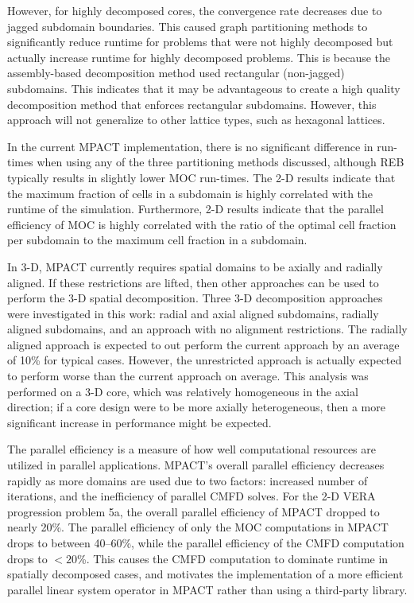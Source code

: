 {{    However, for highly decomposed cores, the convergence rate decreases due to jagged subdomain boundaries.
    This caused graph partitioning methods to significantly reduce runtime for problems that were not highly decomposed but actually increase runtime for highly decomposed problems.
    This is because the assembly-based decomposition method used rectangular (non-jagged) subdomains.
    This indicates that it may be advantageous to create a high quality decomposition method that enforces rectangular subdomains.
    However, this approach will not generalize to other lattice types, such as hexagonal lattices.

    In the current MPACT implementation, there is no significant difference in run-times when using any of the three partitioning methods discussed, although \ac{REB} typically results in slightly lower \ac{MOC} run-times.
    The 2-D results indicate that the maximum fraction of cells in a subdomain is highly correlated with the runtime of the simulation.
    Furthermore, 2-D results indicate that the parallel efficiency of \ac{MOC} is highly correlated with the ratio of the optimal cell fraction per subdomain to the maximum cell fraction in a subdomain.

    In 3-D, MPACT currently requires spatial domains to be axially and radially aligned.
    If these restrictions are lifted, then other approaches can be used to perform the 3-D spatial decomposition.
    Three 3-D decomposition approaches were investigated in this work: radial and axial aligned subdomains, radially aligned subdomains, and an approach with no alignment restrictions.
    The radially aligned approach is expected to out perform the current approach by an average of 10\% for typical cases.
    However, the unrestricted approach is actually expected to perform worse than the current approach on average.
    This analysis was performed on a 3-D core, which was relatively homogeneous in the axial direction; if a core design were to be more axially heterogeneous, then a more significant increase in performance might be expected.

    The parallel efficiency is a measure of how well computational resources are utilized in parallel applications.
    MPACT's overall parallel efficiency decreases rapidly as more domains are used due to two factors: increased number of iterations, and the inefficiency of parallel \ac{CMFD} solves.
    For the 2-D VERA progression problem 5a, the overall parallel efficiency of MPACT dropped to nearly 20\%.
    The parallel efficiency of only the \ac{MOC} computations in MPACT drops to between 40--60\%, while the parallel efficiency of the \ac{CMFD} computation drops to $<\!\!20$\%.
    This causes the \ac{CMFD} computation to dominate runtime in spatially decomposed cases, and motivates the implementation of a more efficient parallel linear system operator in MPACT rather than using a third-party library.
  }

  \printbibliography
}